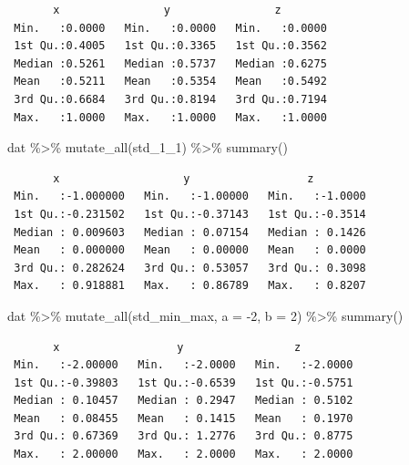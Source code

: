 \documentclass[
  letterpaper,
  DIV=11,
  numbers=noendperiod]{scrreprt}
\newenvironment{Shaded}{\begin{snugshade}}{\end{snugshade}}
\newcommand{\AttributeTok}[1]{\textcolor[rgb]{0.40,0.45,0.13}{#1}}
\newcommand{\DecValTok}[1]{\textcolor[rgb]{0.68,0.00,0.00}{#1}}
\newcommand{\FunctionTok}[1]{\textcolor[rgb]{0.28,0.35,0.67}{#1}}
\newcommand{\NormalTok}[1]{\textcolor[rgb]{0.00,0.23,0.31}{#1}}
\newcommand{\SpecialCharTok}[1]{\textcolor[rgb]{0.37,0.37,0.37}{#1}}
\begin{document}
\begin{verbatim}
       x                y                z         
 Min.   :0.0000   Min.   :0.0000   Min.   :0.0000  
 1st Qu.:0.4005   1st Qu.:0.3365   1st Qu.:0.3562  
 Median :0.5261   Median :0.5737   Median :0.6275  
 Mean   :0.5211   Mean   :0.5354   Mean   :0.5492  
 3rd Qu.:0.6684   3rd Qu.:0.8194   3rd Qu.:0.7194  
 Max.   :1.0000   Max.   :1.0000   Max.   :1.0000  
\end{verbatim}

\begin{Shaded}
\begin{Highlighting}[]
\NormalTok{dat }\SpecialCharTok{\%\textgreater{}\%} \FunctionTok{mutate\_all}\NormalTok{(std\_1\_1) }\SpecialCharTok{\%\textgreater{}\%} \FunctionTok{summary}\NormalTok{()}
\end{Highlighting}
\end{Shaded}

\begin{verbatim}
       x                   y                  z          
 Min.   :-1.000000   Min.   :-1.00000   Min.   :-1.0000  
 1st Qu.:-0.231502   1st Qu.:-0.37143   1st Qu.:-0.3514  
 Median : 0.009603   Median : 0.07154   Median : 0.1426  
 Mean   : 0.000000   Mean   : 0.00000   Mean   : 0.0000  
 3rd Qu.: 0.282624   3rd Qu.: 0.53057   3rd Qu.: 0.3098  
 Max.   : 0.918881   Max.   : 0.86789   Max.   : 0.8207  
\end{verbatim}

\begin{Shaded}
\begin{Highlighting}[]
\NormalTok{dat }\SpecialCharTok{\%\textgreater{}\%} \FunctionTok{mutate\_all}\NormalTok{(std\_min\_max, }\AttributeTok{a =} \SpecialCharTok{{-}}\DecValTok{2}\NormalTok{, }\AttributeTok{b =} \DecValTok{2}\NormalTok{) }\SpecialCharTok{\%\textgreater{}\%} \FunctionTok{summary}\NormalTok{()}
\end{Highlighting}
\end{Shaded}

\begin{verbatim}
       x                  y                 z          
 Min.   :-2.00000   Min.   :-2.0000   Min.   :-2.0000  
 1st Qu.:-0.39803   1st Qu.:-0.6539   1st Qu.:-0.5751  
 Median : 0.10457   Median : 0.2947   Median : 0.5102  
 Mean   : 0.08455   Mean   : 0.1415   Mean   : 0.1970  
 3rd Qu.: 0.67369   3rd Qu.: 1.2776   3rd Qu.: 0.8775  
 Max.   : 2.00000   Max.   : 2.0000   Max.   : 2.0000  
\end{verbatim}
\end{document}

